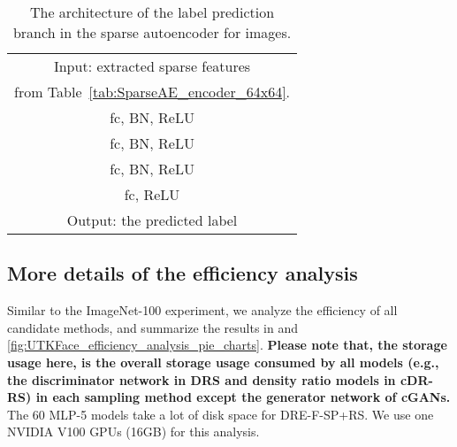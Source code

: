 \documentclass[final,12pt, 3p,times]{elsarticle}
\begin{document}
\begin{table}[h]
	\centering
	\caption{The architecture of the label prediction branch in the sparse autoencoder for  images.}
\begin{tabular}{c}
			\toprule
			Input: extracted sparse features  \\
			from Table~\ref{tab:SparseAE_encoder_64x64}. \\
			\hline
			fc, BN, ReLU \\\hline
			fc, BN, ReLU \\\hline
			fc, BN, ReLU \\\hline
			fc, ReLU \\
			\hline
			Output: the predicted label 
			\\ \bottomrule
		\end{tabular}\label{tab:SparseAE_labelPred_64x64}\end{table}







\subsection{More details of the efficiency analysis}
Similar to the ImageNet-100 experiment, we analyze the efficiency of all candidate methods, and summarize the results in  and \cref{fig:UTKFace_efficiency_analysis_pie_charts}. \textbf{Please note that, the storage usage here, is the overall storage usage consumed by all models (e.g., the discriminator network in DRS and density ratio models in cDR-RS) in each sampling method except the generator network of cGANs.} The 60 MLP-5 models take a lot of disk space for DRE-F-SP+RS. We use one NVIDIA V100 GPUs (16GB) for this analysis.
\end{document}

